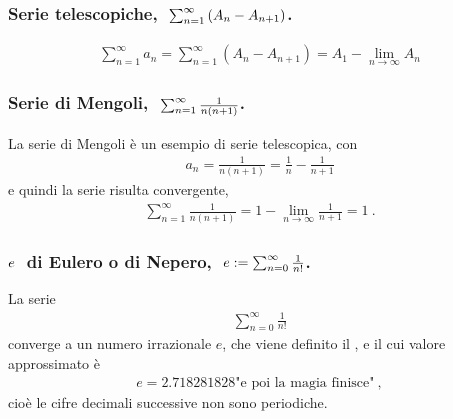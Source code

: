 \documentclass[letterpaper,10pt,italian]{jupyterBook}
\begin{document}
\subsubsection*{Serie telescopiche, \protect\(\ \sum_{n=1}^{\infty} \left( A_n - A_{n+1} \right)\protect\).}
\begin{equation*}
\begin{split}\sum_{n=1}^{\infty} a_n = \sum_{n=1}^{\infty} \left( A_{n} - A_{n+1} \right) = A_1 - \lim_{n \rightarrow \infty} A_n \end{split}
\end{equation*}\subsubsection*{Serie di Mengoli, \protect\(\ \sum_{n=1}^{\infty} \frac{1}{n(n+1)}\protect\).}

\sphinxAtStartPar
La serie di Mengoli è un esempio di serie telescopica, con
\begin{equation*}
\begin{split}a_n = \frac{1}{n(n+1)} = \frac{1}{n} - \frac{1}{n+1}\end{split}
\end{equation*}
\sphinxAtStartPar
e quindi la serie risulta convergente,
\begin{equation*}
\begin{split}\sum_{n=1}^{\infty} \frac{1}{n(n+1)} = 1 - \lim_{n \rightarrow \infty} \frac{1}{n+1} = 1 \ .\end{split}
\end{equation*}\label{\detokenize{ch/series:math-hs-series-e-euler}}\subsubsection*{\protect\(e\ \protect\) di Eulero o di Nepero, \protect\(\ e := \sum_{n=0}^{\infty} \frac{1}{n!}\protect\).}

\sphinxAtStartPar
La serie
\begin{equation*}
\begin{split}\sum_{n=0}^{\infty} \frac{1}{n!}\end{split}
\end{equation*}
\sphinxAtStartPar
converge a un numero irrazionale \(e\), che viene definito il , e il cui valore approssimato è
\begin{equation*}
\begin{split}e = 2.718281828\text{"e poi la magia finisce"} \ ,\end{split}
\end{equation*}
\sphinxAtStartPar
cioè le cifre decimali successive non sono periodiche.
\end{document}
